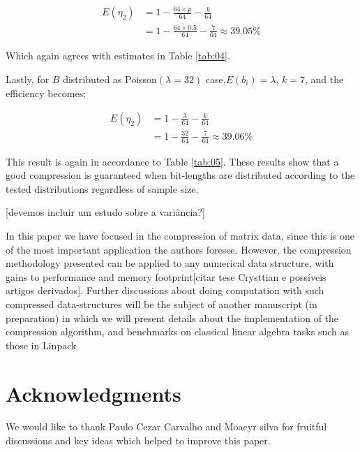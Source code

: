 \documentclass[10pt]{article}
\begin{document}
\begin{align}\label{eq:47}
 E(\eta_2) &= 1 - \frac{64 \times p }{64} - \frac{k}{64}  \\
  &= 1 - \frac{64 \times 0.5 }{64} - \frac{7}{64} \approx 39.05\% \nonumber
\end{align}

Which again agrees with estimates in Table \ref{tab:04}. 

Lastly, for $B$ distributed as Poisson$(\lambda=32)$ case,$E(b_i) = \lambda$, $k=7$, and the efficiency becomes:

\begin{align}\label{eq:49}
 E(\eta_2) &= 1 - \frac{\lambda}{64} - \frac{k}{64} \\
 &= 1 - \frac{32}{64} - \frac{7}{64} \approx 39.06\%
\end{align}

This result is again in accordance to Table \ref{tab:05}. These results show that a good compression is guaranteed when bit-lengths are distributed according to the tested distributions regardless of sample size.

[devemos incluir um estudo sobre a variância?]

In this paper we have focused in the compression of matrix data, since this is one of the most important application the authors foresee. However, the compression methodology presented can be applied to any numerical data structure, with gains to performance and memory footprint[citar tese Crysttian e possíveis artigos derivados]. Further discussions about doing computation with such compressed data-structures will be the subject of another manuscript (in preparation) in which we will present details about the implementation of the compression algorithm, and benchmarks on classical linear algebra tasks such as those in Linpack 



\section*{Acknowledgments}
We would like to thank Paulo Cezar Carvalho and Moacyr silva for fruitful discussions and key ideas which helped to improve this paper.


\end{document}
